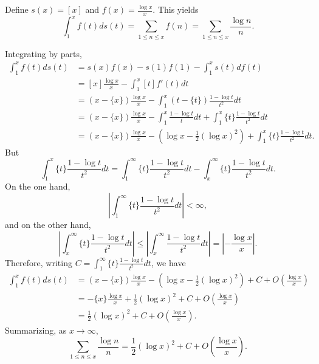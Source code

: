 Define $s(x) = [x]$ and $f(x)=\frac{\log x}{x}$.
This yields
\[
\int_1^x f(t) ds(t) = \sum_{1 \leq n \leq x} f(n) = 
\sum_{1 \leq n \leq x} \frac{\log n}{n}.
\]

 Integrating by parts,
\begin{align*}
\int_1^x f(t) ds(t)&=s(x)f(x)-s(1)f(1) - \int_1^x s(t) df(t)\\
&=[x] \frac{\log x}{x} - \int_1^x [t] f'(t) dt\\
&=(x-\{x\}) \frac{\log x}{x} - \int_1^x(t-\{t\}) \frac{1-\log t}{t^2} dt\\
&=(x-\{x\})\frac{\log x}{x} -\int_1^x \frac{1-\log t}{t} dt
+ \int_1^x \{t\} \frac{1-\log t}{t^2} dt\\
&=(x-\{x\})\frac{\log x}{x} - \left(\log x - \frac{1}{2} (\log x)^2 \right)+\int_1^x \{t\} \frac{1-\log t}{t^2} dt.
\end{align*}
But
\[
\int_1^x \{t\} \frac{1-\log t}{t^2} dt=\int_1^\infty \{t\} \frac{1-\log t}{t^2} dt - 
\int_x^\infty \{t\} \frac{1-\log t}{t^2} dt.
\]
On the one hand,
\[
\left|\int_1^\infty \{t\} \frac{1-\log t}{t^2} dt \right| < \infty,
\]
and on the other hand,
\[
\left| \int_x^\infty \{t\} \frac{1-\log t}{t^2} dt \right|
\leq \left| \int_x^\infty \frac{1-\log t}{t^2} dt \right|
=\left| -\frac{\log x}{x} \right|.
\]
Therefore, writing $C=\int_1^\infty \{t\} \frac{1-\log t}{t^2} dt$, we have
\begin{align*}
\int_1^x f(t) ds(t) &= (x-\{x\})\frac{\log x}{x} - \left(\log x - \frac{1}{2} (\log x)^2 \right)
+C + O\left(\frac{\log x}{x}\right)\\
&=-\{x\} \frac{\log x}{x} + \frac{1}{2}(\log x)^2 + C  +O\left(\frac{\log x}{x}\right)\\
&=\frac{1}{2}(\log x)^2 + C  +O\left(\frac{\log x}{x}\right).
\end{align*}
Summarizing, as $x \to \infty$,
\[
\sum_{1 \leq n \leq x} \frac{\log n}{n} = \frac{1}{2}(\log x)^2 + C  +O\left(\frac{\log x}{x}\right).
\]